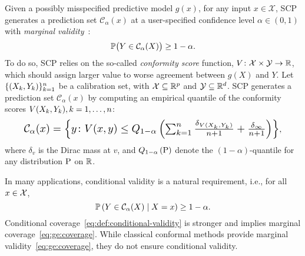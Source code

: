   Given a possibly misspecified predictive model $g(x)$, for any input $x \in \mathcal{X}$, SCP~\cite{papadopoulos2002inductive} generates a prediction set $\mathcal{C}_{\alpha}(x)$ at a user-specified confidence level $\alpha \in (0, 1)$ with \textit{marginal validity}~\cite{papadopoulos2008inductive}:
  \begin{equation}
  \label{eq:ge:coverage}
    \mathbb{P}\bigl(Y \in \mathcal{C}_{\alpha}(X)\bigr) \ge 1-\alpha.
  \end{equation}
  To do so, SCP relies on the so-called \textit{conformity score} function, $V\colon \mathcal{X} \times \mathcal{Y} \to \mathbb{R}$, which should assign larger value to worse agreement between $g(X)$ and $Y$. Let $\{(X_k,Y_k)\}_{k=1}^{n}$ be a calibration set, with $\mathcal{X} \subseteq \mathbb{R}^p$ and $\mathcal{Y} \subseteq \mathbb{R}^d$. SCP generates a prediction set $\mathcal{C}_{\alpha}(x)$ by computing an empirical quantile of the conformity scores $V(X_k, Y_k), k = 1, \dots, n$:
  \begin{equation}\label{eq:split_conformal}
    \resizebox{0.9\hsize}{!}{$
    \mathcal{C}_{\alpha}(x)
    = \ac{
      y\colon V(x, y) \le \q{1-\alpha}\pr{\sum_{k=1}^{\tcount} \frac{\delta_{V(X_k, Y_k)}}{\tcount+1} + \frac{\delta_{\infty}}{\tcount+1} }
    }
    $},
  \end{equation}
  where $\delta_v$ is the Dirac mass at $v$, and $Q_{1-\alpha}\left({\textup{P}}\right)$ denote the $(1-\alpha)$-quantile for any distribution $\textup{P}$ on $\mathbb{R}$.

  In many applications, conditional validity is a natural requirement, i.e., for all $x \in \mathcal{X}$,
  \begin{equation}
  \label{eq:def:conditional-validity}
    \mathbb{P}\left({Y \in \mathcal{C}_{\alpha}(X) \mid X = x}\right) \ge 1 - \alpha.
  \end{equation}
  Conditional coverage~\eqref{eq:def:conditional-validity} is stronger and implies marginal coverage~\eqref{eq:ge:coverage}. While classical conformal methods provide marginal validity~\eqref{eq:ge:coverage}, they do not ensure conditional validity. 

